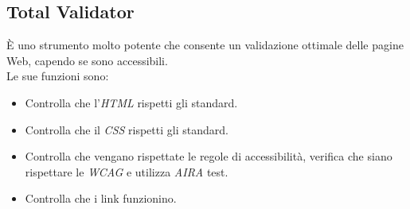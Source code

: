 \subsection{Total Validator}
È uno strumento molto potente che consente un validazione ottimale delle pagine Web, capendo se sono accessibili.\\
Le sue funzioni sono:
\begin{itemize}
	\item Controlla che l'\emph{HTML} rispetti gli standard.
	\item Controlla che il \emph{CSS} rispetti gli standard.
	\item Controlla che vengano rispettate le regole di accessibilità, verifica che siano rispettare le \emph{WCAG} e utilizza \emph{AIRA} test.
	\item Controlla che i link funzionino.
\end{itemize}